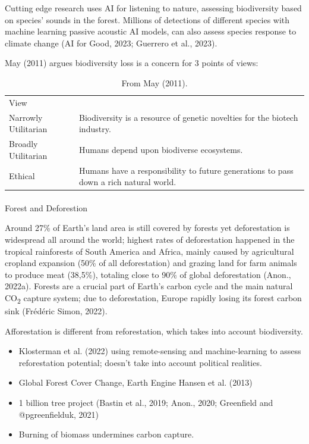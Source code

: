 \documentclass[
  letterpaper,
  DIV=11,
  numbers=noendperiod]{scrartcl}
\makeatletter
\let\oldparagraph\paragraph
\renewcommand{\paragraph}{
    \@ifstar
      \xxxParagraphStar
      \xxxParagraphNoStar
  }
\newcommand{\xxxParagraphStar}[1]{\oldparagraph*{#1}\mbox{}}
\newcommand{\xxxParagraphNoStar}[1]{\oldparagraph{#1}\mbox{}}
\makeatother
\begin{document}
Cutting edge research uses AI for listening to nature, assessing
biodiversity based on species' sounds in the forest. Millions of
detections of different species with machine learning passive acoustic
AI models, can also assess species response to climate change (AI for
Good, 2023; Guerrero et al., 2023).

May (2011) argues biodiversity loss is a concern for 3 points of views:

\begin{longtable}[]{@{}
  >{\raggedright\arraybackslash}p{}
  >{\raggedright\arraybackslash}p{}@{}}
\caption{From May (2011).}\tabularnewline
\toprule\noalign{}
\endfirsthead
\endhead
\bottomrule\noalign{}
\endlastfoot
View & \\
Narrowly Utilitarian & Biodiversity is a resource of genetic novelties
for the biotech industry. \\
Broadly Utilitarian & Humans depend upon biodiverse ecosystems. \\
Ethical & Humans have a responsibility to future generations to pass
down a rich natural world. \\
\end{longtable}

\paragraph{Forest and Deforestion}\label{forest-and-deforestion}

Around 27\% of Earth's land area is still covered by forests yet
deforestation is widespread all around the world; highest rates of
deforestation happened in the tropical rainforests of South America and
Africa, mainly caused by agricultural cropland expansion (50\% of all
deforestation) and grazing land for farm animals to produce meat
(38,5\%), totaling close to 90\% of global deforestation (Anon., 2022a).
Forests are a crucial part of Earth's carbon cycle and the main natural
CO\textsubscript{2} capture system; due to deforestation, Europe rapidly
losing its forest carbon sink (Frédéric Simon, 2022).

Afforestation is different from reforestation, which takes into account
biodiversity.

\begin{itemize}
\item
  Klosterman et al. (2022) using remote-sensing and machine-learning to
  assess reforestation potential; doesn't take into account political
  realities.
\item
  Global Forest Cover Change, Earth Engine Hansen et al. (2013)
\item
  1 billion tree project (Bastin et al., 2019; Anon., 2020; Greenfield
  and @pgreenfielduk, 2021)
\item
  Burning of biomass undermines carbon capture.
\end{itemize}
\end{document}
